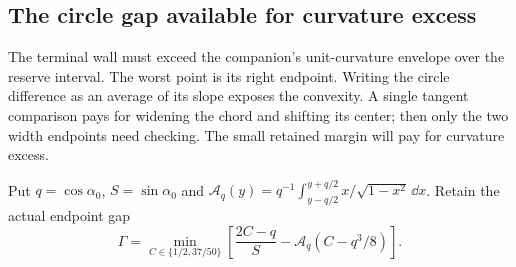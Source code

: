 \subsection{The circle gap available for curvature excess}

The terminal wall must exceed the companion's unit-curvature envelope
over the reserve interval. The worst point is its right endpoint.
Writing the circle difference as an average of its slope exposes the
convexity. A single tangent comparison pays for widening the chord
and shifting its center; then only the two width endpoints need checking. The small retained margin will pay for curvature excess.

Put $q=\cos\alpha_0$, $S=\sin\alpha_0$ and
$\mathcal A_q(y)=q^{-1}\int_{y-q/2}^{y+q/2}x/\sqrt{1-x^2}\,\dd x$.
Retain the actual endpoint gap
\[
 \Gamma=\min_{C\in\{1/2,37/50\}}
 \left[\frac{2C-q}{S}-\mathcal A_q(C-q^3/8)\right].
\]

